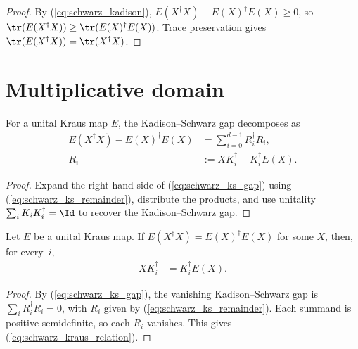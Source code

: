 \begin{proof}\leanok{}
    By (\ref{eq:schwarz_kadison}),
    $E(X^\dagger X) - E(X)^\dagger E(X) \ge 0$, so
    $\tr(E(X^\dagger X)) \ge \tr(E(X)^\dagger E(X))$.
    Trace preservation gives $\tr(E(X^\dagger X)) = \tr(X^\dagger X)$.
\end{proof}

\section{Multiplicative domain}

\begin{theorem}\label{thm:ks_gap_decomp}
    \leanok
    For a unital Kraus map $E$, the Kadison--Schwarz gap decomposes as
    \begin{align}
        E(X^\dagger X)-E(X)^\dagger E(X)
        &= \sum_{i=0}^{d-1} R_i^\dagger R_i,
        \label{eq:schwarz_ks_gap}\\
        R_i
        &:= X K_i^\dagger-K_i^\dagger E(X).
        \label{eq:schwarz_ks_remainder}
    \end{align}
\end{theorem}

\begin{proof}
    \leanok
    Expand the right-hand side of (\ref{eq:schwarz_ks_gap}) using
    (\ref{eq:schwarz_ks_remainder}), distribute the products, and use
    unitality $\sum_i K_i K_i^\dagger = \Id$ to recover the
    Kadison--Schwarz gap.
\end{proof}

\begin{theorem}\label{thm:kraus_commute}
    \leanok
    Let $E$ be a unital Kraus map.
    If $E(X^\dagger X) = E(X)^\dagger E(X)$ for some $X$, then, for every~$i$,
    \begin{align}
        X K_i^\dagger
        &= K_i^\dagger E(X).
        \label{eq:schwarz_kraus_relation}
    \end{align}
\end{theorem}

\begin{proof}\leanok{}
    By (\ref{eq:schwarz_ks_gap}), the vanishing Kadison--Schwarz gap is
    $\sum_i R_i^\dagger R_i=0$, with $R_i$ given by
    (\ref{eq:schwarz_ks_remainder}). Each summand is positive semidefinite, so
    each $R_i$ vanishes. This gives (\ref{eq:schwarz_kraus_relation}).
\end{proof}


